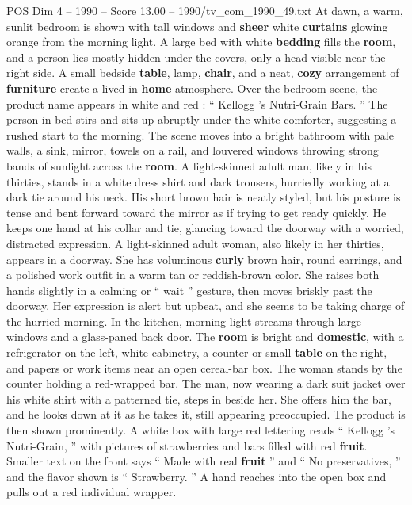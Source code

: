 \begin{textsample}{POS Dim 4 – 1990 – Score 13.00 – 1990/tv\_com\_1990\_49.txt}  \label{ex:f4_pos_077}
At dawn, a warm, sunlit bedroom is shown with tall windows and \textbf{sheer} white \textbf{curtains} glowing orange from the morning light.
A large bed with white \textbf{bedding} fills the \textbf{room}, and a person lies mostly hidden under the covers, only a head visible near the right side.
A small bedside \textbf{table}, lamp, \textbf{chair}, and a neat, \textbf{cozy} arrangement of \textbf{furniture} create a lived-in \textbf{home} atmosphere.
Over the bedroom scene, the product name appears in white and red : “ Kellogg ’s Nutri-Grain Bars. ” The person in bed stirs and sits up abruptly under the white comforter, suggesting a rushed start to the morning.
The scene moves into a bright bathroom with pale walls, a sink, mirror, towels on a rail, and louvered windows throwing strong bands of sunlight across the \textbf{room}.
A light-skinned adult man, likely in his thirties, stands in a white dress shirt and dark trousers, hurriedly working at a dark tie around his neck.
His short brown hair is neatly styled, but his posture is tense and bent forward toward the mirror as if trying to get ready quickly.
He keeps one hand at his collar and tie, glancing toward the doorway with a worried, distracted expression.
A light-skinned adult woman, also likely in her thirties, appears in a doorway.
She has voluminous \textbf{curly} brown hair, round earrings, and a polished work outfit in a warm tan or reddish-brown color.
She raises both hands slightly in a calming or “ wait ” gesture, then moves briskly past the doorway.
Her expression is alert but upbeat, and she seems to be taking charge of the hurried morning.
In the kitchen, morning light streams through large windows and a glass-paned back door.
The \textbf{room} is bright and \textbf{domestic}, with a refrigerator on the left, white cabinetry, a counter or small \textbf{table} on the right, and papers or work items near an open cereal-bar box.
The woman stands by the counter holding a red-wrapped bar.
The man, now wearing a dark suit jacket over his white shirt with a patterned tie, steps in beside her.
She offers him the bar, and he looks down at it as he takes it, still appearing preoccupied.
The product is then shown prominently.
A white box with large red lettering reads “ Kellogg ’s Nutri-Grain, ” with pictures of strawberries and bars filled with red \textbf{fruit}.
Smaller text on the front says “ Made with real \textbf{fruit} ” and “ No preservatives, ” and the flavor shown is “ Strawberry. ” A hand reaches into the open box and pulls out a red individual wrapper.

\end{textsample}

